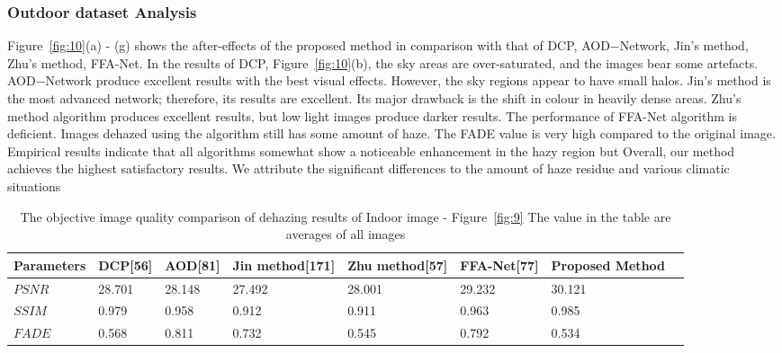 \documentclass[doctor,english,listoffigures,listoftables]{thesis-uestc}
\begin{document}
\subsubsection{Outdoor dataset Analysis}
Figure~\ref{fig:10}(a) - (g) shows the after-effects of the proposed method in comparison with that of DCP, AOD$-$Network, Jin's method, Zhu's method, FFA-Net. In the results of DCP, Figure~\ref{fig:10}(b), the sky areas are over-saturated, and the images bear some artefacts. AOD$-$Network produce excellent results with the best visual effects. However, the sky regions appear to have small halos. Jin's method is the most advanced network; therefore, its results are excellent. Its major drawback is the shift in colour in heavily dense areas. Zhu's method algorithm produces excellent results, but low light images produce darker results. The performance of FFA-Net algorithm is deficient. Images dehazed using the algorithm still has some amount of haze. The FADE value is very high compared to the original image. Empirical results indicate that all algorithms somewhat show a noticeable enhancement in the hazy region but  Overall, our method achieves the highest satisfactory results. We attribute the significant differences to the amount of haze residue and various climatic situations

\begin{table}
	\centering
	\caption{The objective image quality comparison of dehazing results of Indoor image - Figure~\ref{fig:9} The value in the table are averages of all images}
    \begin{tabular}{|p{49pt}|p{50pt}|p{50pt}|p{52pt}|p{52pt}|p{52pt}|p{52pt}|p{52pt}|}
    
	\hline\textbf{Parameters}	& \textbf{DCP[56]}& \textbf{AOD[81]} &  \textbf{Jin method[171]}	& \textbf{Zhu method[57]} & \textbf{FFA-Net[77]}  &  \textbf{Proposed Method}\\
	\hline
	$ PSNR$&28.701&28.148&27.492&28.001&29.232&30.121\\
		\hline	
	$SSIM$&0.979&0.958&0.912&0.911&0.963&0.985\\
		\hline	
	$FADE$&0.568&0.811&0.732&0.545&0.792&0.534\\
	\hline	
\end{tabular}
	\label{Tab6}
\end{table}
\end{document}
